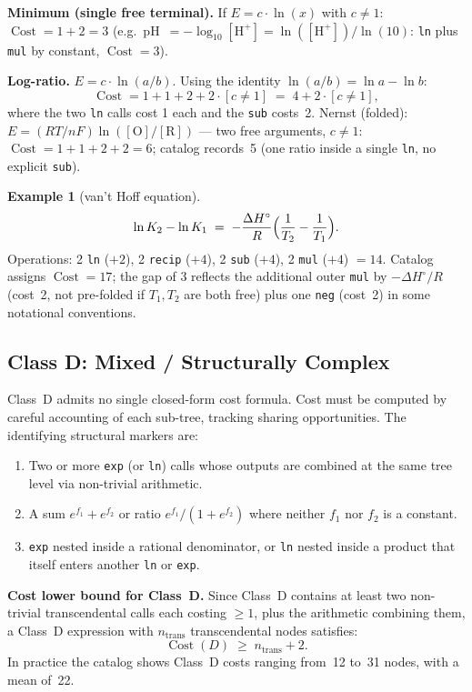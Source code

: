 \documentclass[12pt,a4paper]{article}
\theoremstyle{definition}
\newtheorem{example}[theorem]{Example}
\newcommand{\Cost}{\operatorname{Cost}}
\begin{document}
\noindent\textbf{Minimum (single free terminal).}
If $E = c \cdot \ln(x)$ with $c \neq 1$: $\Cost = 1 + 2 = 3$ (e.g.\
pH~$= -\log_{10}[\mathrm{H}^+] = \ln([\mathrm{H}^+])/\ln(10)$:
\texttt{ln} plus \texttt{mul} by constant, $\Cost = 3$).

\noindent\textbf{Log-ratio.}
$E = c \cdot \ln(a/b)$.
Using the identity $\ln(a/b) = \ln a - \ln b$:
\[
  \Cost = 1 + 1 + 2 + 2 \cdot [c \neq 1] \;=\; 4 + 2 \cdot [c \neq 1],
\]
where the two \texttt{ln} calls cost 1 each and the \texttt{sub} costs~2.
Nernst (folded): $E = (RT/nF)\ln([\mathrm{O}]/[\mathrm{R}])$ --- two free
arguments, $c \neq 1$: $\Cost = 1 + 1 + 2 + 2 = 6$; catalog records~5
(one ratio inside a single \texttt{ln}, no explicit \texttt{sub}).

\begin{example}[van't Hoff equation]
\[
  \ln K_2 - \ln K_1 \;=\; -\frac{\Delta H^\circ}{R}
    \Bigl(\frac{1}{T_2} - \frac{1}{T_1}\Bigr).
\]
Operations: 2 \texttt{ln} ($+2$), 2 \texttt{recip} ($+4$), 2 \texttt{sub}
($+4$), 2 \texttt{mul} ($+4$) $= 14$.
Catalog assigns $\Cost = 17$; the gap of 3 reflects the additional
outer \texttt{mul} by $-\Delta H^\circ / R$ (cost~2, not pre-folded if
$T_1, T_2$ are both free) plus one \texttt{neg} (cost~2) in some
notational conventions.
\end{example}

\subsection{Class D: Mixed / Structurally Complex}
\label{subsec:classD}

Class~D admits no single closed-form cost formula.
Cost must be computed by careful accounting of each sub-tree, tracking
sharing opportunities.
The identifying structural markers are:
\begin{enumerate}
  \item Two or more \texttt{exp} (or \texttt{ln}) calls whose outputs
        are combined at the same tree level via non-trivial arithmetic.
  \item A sum $e^{f_1} + e^{f_2}$ or ratio $e^{f_1}/(1 + e^{f_2})$
        where neither $f_1$ nor $f_2$ is a constant.
  \item \texttt{exp} nested inside a rational denominator, or \texttt{ln}
        nested inside a product that itself enters another \texttt{ln} or
        \texttt{exp}.
\end{enumerate}

\noindent\textbf{Cost lower bound for Class~D.}
Since Class~D contains at least two non-trivial transcendental calls each
costing $\geq 1$, plus the arithmetic combining them, a Class~D expression
with $n_{\mathrm{trans}}$ transcendental nodes satisfies:
\[
  \Cost(D) \;\geq\; n_{\mathrm{trans}} + 2.
\]
In practice the catalog shows Class~D costs ranging from~12 to~31 nodes,
with a mean of~22.
\end{document}
